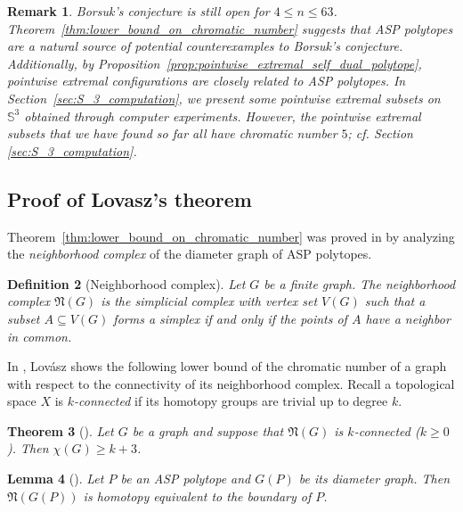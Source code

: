 \documentclass[12pt]{amsart}
\theoremstyle{plain}
\newtheorem{theorem}{Theorem}[section]
\newtheorem{lemma}[theorem]{Lemma}
\newtheorem{remark}[theorem]{Remark}
\newtheorem{definition}[theorem]{Definition}
\newcommand{\Sp}{\mathbb{S}}
\numberwithin{equation}{section}
\begin{document}
\begin{remark}\label{rmk:antiprism}
Borsuk’s conjecture is still open for $4\leq n \leq 63$.
Theorem~\ref{thm:lower_bound_on_chromatic_number} suggests that ASP
polytopes are a natural source of potential counterexamples to
Borsuk's conjecture. Additionally, by
Proposition~\ref{prop:pointwise_extremal_self_dual_polytope},
pointwise extremal configurations are closely related to ASP
polytopes.  In Section~\ref{sec:S_3_computation}, we present some
pointwise extremal subsets on $\Sp^3$ obtained through computer
experiments.  However, the pointwise extremal subsets that we have
found so far all have chromatic number $5$; cf. Section
\ref{sec:S_3_computation}.
\end{remark}


\subsection{Proof of Lovasz's theorem}
\label{s41}

Theorem~\ref{thm:lower_bound_on_chromatic_number} was proved in
\cite{lovasz1983self} by analyzing the \emph{neighborhood complex} of
the diameter graph of ASP polytopes.


\begin{definition}[Neighborhood complex]
Let $G$ be a finite graph. The \emph{neighborhood complex}
$\mathfrak{N}(G)$ is the simplicial complex with vertex set $V(G)$
such that a subset $A\subseteq V(G)$ forms a simplex if and only if
the points of $A$ have a neighbor in common.
\end{definition}

In \cite{lovasz1978kneser}, Lov\'asz shows the following lower bound of the chromatic number of a graph with respect to the connectivity of its neighborhood complex. Recall a topological space $X$ is \emph{$k $-connected} if its homotopy groups are trivial up to degree $k$.

\begin{theorem}[\cite{lovasz1978kneser}]\label{thm:chromatic_bound_by_neighborhood_complex}
	Let $G$ be a graph and suppose that $\mathfrak{N}(G)$ is $k$-connected ($k\geq 0$). Then $\chi(G)\geq k+3$.
\end{theorem}



\begin{lemma}[{\cite[Lemma 4]{lovasz1983self}}]\label{lem:homotopy_type_neighborhood_complex}
Let $P$ be an ASP polytope and $G(P)$ be its diameter graph. Then
$\mathfrak{N}(G(P))$ is homotopy equivalent to the boundary of $P$.
\end{lemma}
\end{document}
